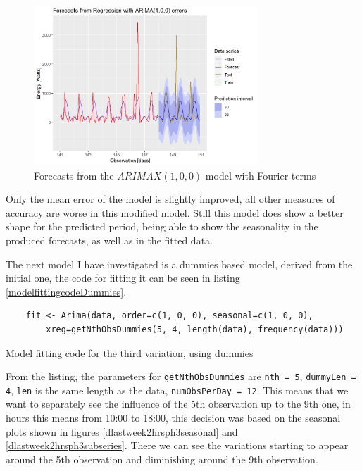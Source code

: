 \documentclass[12pt,a4paper,titlepage]{report}
\begin{document}
\begin{figure}[h]
    \centering
    \includegraphics[width=0.75\textwidth]{dlastweek2hrsph3forecastsFourier}
    \caption{Forecasts from the $ ARIMAX(1, 0, 0) $ model with Fourier terms}
    \label{dlastweek2hrsph3forecastsFourier}
\end{figure}

Only the mean error of the model is slightly improved, all other measures of accuracy are worse in this modified model. Still this model does show a better shape for the predicted period, being able to show the seasonality in the produced forecasts, as well as in the fitted data.

The next model I have investigated is a dummies based model, derived from the initial one, the code for fitting it can be seen in listing \ref{modelfittingcodeDummies}.

\begin{listing}[h]
    \begin{verbatim}
    fit <- Arima(data, order=c(1, 0, 0), seasonal=c(1, 0, 0),
        xreg=getNthObsDummies(5, 4, length(data), frequency(data)))
    \end{verbatim}
    
    \caption{Model fitting code for the third variation, using dummies}
    \label{modelfittingcodeDummies}
\end{listing}

From the listing, the parameters for \texttt{getNthObsDummies} are \texttt{nth = 5}, \texttt{dummyLen = 4}, \texttt{len} is the same length as the data, \texttt{numObsPerDay = 12}. This means that we want to separately see the influence of the 5th observation up to the 9th one, in hours this means from 10:00 to 18:00, this decision was based on the seasonal plots shown in figures \ref{dlastweek2hrsph3seasonal} and \ref{dlastweek2hrsph3subseries}. There we can see the variations starting to appear around the 5th observation and diminishing around the 9th observation.
\end{document}
